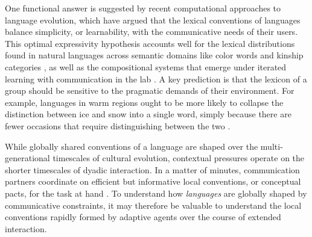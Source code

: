 \documentclass[10pt,letterpaper]{article}
\begin{document}
One functional answer is suggested by recent computational approaches to language evolution, which have argued that the lexical conventions of languages balance simplicity, or learnability, with the communicative needs of their users. This optimal expressivity hypothesis accounts well for the lexical distributions found in natural languages across semantic domains like color words and kinship categories \cite{RegierKempKay15_WordMeaningsEfficientCommunication}, as well as the compositional systems that emerge under iterated learning with communication in the lab \cite{WintersKirbySmith14_LanguagesAdapt, KirbyTamarizCornishSmith15_CompressionCommunication}. A key prediction is that the lexicon of a group should be sensitive to the pragmatic demands of their environment. For example, languages in warm regions ought to be more likely to collapse the distinction between ice and snow into a single word, simply because there are fewer occasions that require distinguishing between the two \cite{RegierCarstensenKemp16_WordsForSnow}. 

While globally shared conventions of a language are shaped over the multi-generational timescales of cultural evolution, contextual pressures operate on the shorter timescales of dyadic interaction. In a matter of minutes, communication partners coordinate on efficient but informative local conventions, or conceptual pacts, for the task at hand \cite{ClarkWilkesGibbs86_ReferringCollaborative, BrennanClark96_ConceptualPactsConversation,HawkinsFrankGoodman17_ConventionFormation}. To understand how \emph{languages} are globally shaped by communicative constraints, it may therefore be valuable to understand the local conventions rapidly formed by adaptive agents over the course of extended interaction.
\end{document}
